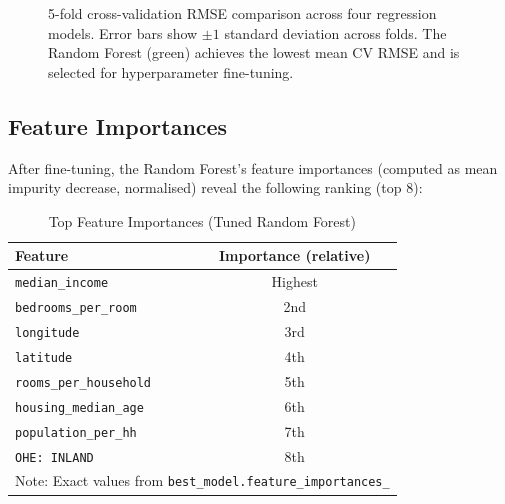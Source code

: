\documentclass[conference]{IEEEtran}
\begin{document}
\begin{figure}[H]
    \centering
    \caption{5-fold cross-validation RMSE comparison across four regression models. Error bars show $\pm 1$ standard deviation across folds. The Random Forest (green) achieves the lowest mean CV RMSE and is selected for hyperparameter fine-tuning.}
    \label{fig:model_comparison}
\end{figure}

\subsection{Feature Importances}

After fine-tuning, the Random Forest's feature importances (computed as mean impurity decrease, normalised) reveal the following ranking (top 8):

\begin{table}[H]
\centering
\caption{Top Feature Importances (Tuned Random Forest)}
\label{tab:feat_importance}
\begin{tabular}{@{}lc@{}}
\toprule
\textbf{Feature} & \textbf{Importance (relative)} \\
\midrule
\texttt{median\_income}         & Highest \\
\texttt{bedrooms\_per\_room}    & 2nd \\
\texttt{longitude}              & 3rd \\
\texttt{latitude}               & 4th \\
\texttt{rooms\_per\_household}  & 5th \\
\texttt{housing\_median\_age}   & 6th \\
\texttt{population\_per\_hh}    & 7th \\
\texttt{OHE: INLAND}            & 8th \\
\bottomrule
\multicolumn{2}{l}{\small Note: Exact values from \texttt{best\_model.feature\_importances\_}}
\end{tabular}
\end{table}
\end{document}
